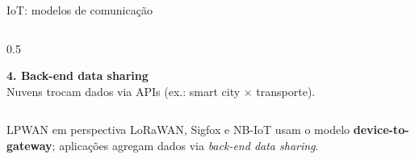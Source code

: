 \documentclass[aspectratio=169,11pt]{beamer}
\begin{document}
\begin{frame}{IoT: modelos de comunicação}
\begin{columns}[t]
\begin{column}{0.5\textwidth}
\begin{center}
\begin{tikzpicture}
        \end{tikzpicture}
      \end{center}
      \vspace{0.02cm}
      \textbf{4. Back-end data sharing}\\[1mm]
      Nuvens trocam dados via APIs (ex.: smart city $\times$ transporte).
      \begin{center}
      \end{center}
    \end{column}
  \end{columns}
  \pause
  \begin{exampleblock}{LPWAN em perspectiva}
    LoRaWAN, Sigfox e NB-IoT usam o modelo \textbf{device-to-gateway}; aplicações agregam dados via \emph{back-end data sharing}.
  \end{exampleblock}
\end{frame}
\end{document}

